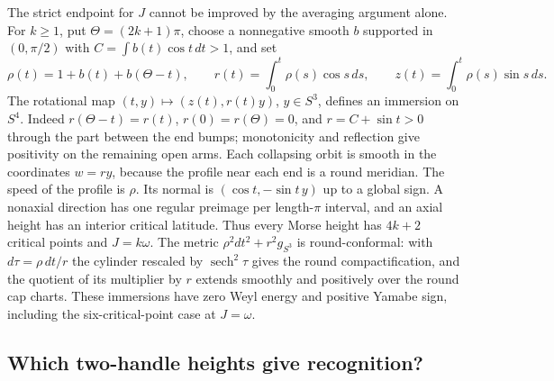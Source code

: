 \documentclass[11pt,letterpaper]{article}
\numberwithin{equation}{section}
\begin{document}
The strict endpoint for \(J\) cannot be improved by the
averaging argument alone. For \(k\ge1\), put
\(\Theta=(2k+1)\pi\), choose a nonnegative smooth \(b\) supported
in \((0,\pi/2)\) with \(C=\int b(t)\cos t\,dt>1\), and set
\[
 \rho(t)=1+b(t)+b(\Theta-t),\qquad
 r(t)=\int_0^t\rho(s)\cos s\,ds,\qquad
 z(t)=\int_0^t\rho(s)\sin s\,ds.
\]
The rotational map \((t,y)\mapsto (z(t),r(t)y)\),
\(y\in S^3\), defines an immersion on \(S^4\).
Indeed \(r(\Theta-t)=r(t)\), \(r(0)=r(\Theta)=0\),
and \(r=C+\sin t>0\) through the part between the end
bumps; monotonicity and reflection give positivity on
the remaining open arms. Each collapsing orbit is smooth
in the coordinates \(w=r y\), because the profile near
each end is a round meridian. The speed of the profile
is \(\rho\). Its normal is \((\cos t,-\sin t\,y)\) up to
a global sign. A nonaxial direction has one regular
preimage per length-\(\pi\) interval, and an axial height
has an interior critical latitude. Thus every Morse height
has \(4k+2\) critical points and \(J=k\omega\). The metric
\(\rho^2dt^2+r^2g_{S^3}\) is round-conformal: with
\(d\tau=\rho\,dt/r\) the cylinder rescaled by
\(\operatorname{sech}^2\tau\) gives the round compactification,
and the quotient of its multiplier by \(r\) extends
smoothly and positively over the round cap charts.
These immersions have zero Weyl energy and positive Yamabe
sign, including the six-critical-point case at \(J=\omega\).

\subsection{Which two-handle heights give recognition?}
\end{document}
